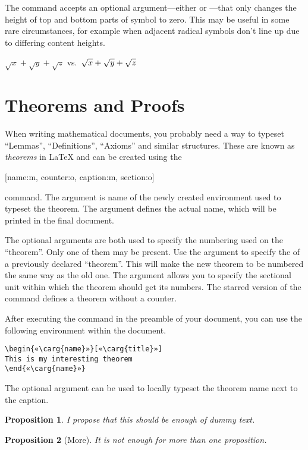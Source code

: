 The  command accepts an optional argument---either  or
---that only changes the height of top and bottom parts of symbol to
zero. This may be useful in some rare circumstances, for example when adjacent
radical symbols don't line up due to differing content heights.
\begin{example}
\(  \sqrt{x} 
  + \sqrt{y} 
  + \sqrt{z}\)
vs.\
\(  \sqrt{x} 
  + \sqrt{\smash[b]{y}} 
  + \sqrt{z} \)
\end{example}

\section{Theorems and Proofs}

When writing mathematical documents, you probably need a way to typeset
\enquote{Lemmas}, \enquote{Definitions}, \enquote{Axioms} and similar
structures. These are known as \emph{theorems} in \LaTeX{} and can be created
using the
\begin{lscommand}
  [name:m, counter:o, caption:m, section:o]
\end{lscommand}
command. The  argument is name of the newly created environment used
to typeset the theorem. The \carg{caption} argument defines the actual name,
which will be printed in the final document.

The optional arguments are both used to specify the numbering used on the
\enquote{theorem}. Only one of them may be present. Use the \carg{counter}
argument to specify the \carg{name} of a previously declared \enquote{theorem}.
This will make the new theorem to be numbered the same way as the old one. The
\carg{section} argument allows you to specify the sectional unit within which
the theorem should get its numbers. The starred version of the command defines
a theorem without a counter.

After executing the  command in the preamble of your document,
you can use the following environment within the document.
\begin{verbatim}
\begin{«\carg{name}»}[«\carg{title}»]
This is my interesting theorem
\end{«\carg{name}»}
\end{verbatim}
The optional  argument can be used to locally typeset the theorem
name next to the caption.
\begin{example}[standalone, paperheight=4cm]
\newtheorem{proposition}{Proposition}
\begin{proposition}
  I propose that this should 
  be enough of dummy text.
\end{proposition}
\begin{proposition}[More]
  It is not enough for more
  than one proposition.
\end{proposition}
\end{example}


